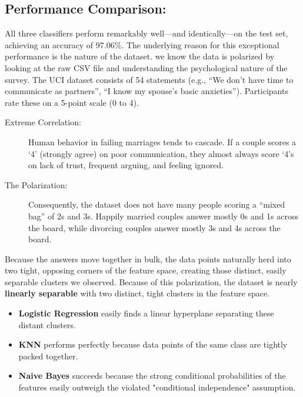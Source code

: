 \documentclass[twoside, 10pt]{article}
\begin{document}
\subsection*{Performance Comparison:}
All three classifiers perform remarkably well—and identically—on the test set, achieving an accuracy of 97.06\%.  
The underlying reason for this exceptional performance is the nature of the dataset. we know the data is polarized by looking at the raw CSV file and understanding the psychological nature of the survey. 
The UCI dataset consists of 54 statements (e.g., ``We don't have time to communicate as partners'', ``I know my spouse's basic anxieties''). Participants rate these on a 5-point scale (0 to 4).
\begin{description}
    \item[Extreme Correlation:] Human behavior in failing marriages tends to cascade. If a couple scores a `4' (strongly agree) on poor communication, they almost always score `4's on lack of trust, frequent arguing, and feeling ignored.
    \item[The Polarization:] Consequently, the dataset does not have many people scoring a ``mixed bag'' of 2s and 3s. Happily married couples answer mostly 0s and 1s across the board, while divorcing couples answer mostly 3s and 4s across the board.
\end{description}
Because the answers move together in bulk, the data points naturally herd into two tight, opposing corners of the feature space, creating those distinct, easily separable clusters we observed.
Because of this polarization, the dataset is nearly \textbf{linearly separable} with two distinct, tight clusters in the feature space. 
\begin{itemize}
    \item \textbf{Logistic Regression} easily finds a linear hyperplane separating these distant clusters.
    \item \textbf{KNN} performs perfectly because data points of the same class are tightly packed together.
    \item \textbf{Naive Bayes} succeeds because the strong conditional probabilities of the features easily outweigh the violated "conditional independence" assumption.
\end{itemize}
\end{document}
